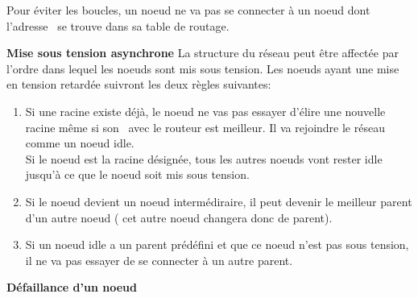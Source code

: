         Pour éviter les boucles, un noeud ne va pas se connecter à un noeud dont l'adresse \mac\ se trouve dans sa table de routage.
        \vspace{0.5cm}

        \textbf{Mise sous tension asynchrone}\newline
            La structure du réseau peut être affectée par l'ordre dans lequel les noeuds sont mis sous tension.
            Les noeuds ayant une mise en tension retardée suivront les deux règles suivantes:
            \begin{enumerate}
                \item Si une racine existe déjà, le noeud ne vas pas essayer d'élire une nouvelle racine
                    même si son \rssi\ avec le routeur est meilleur. Il va rejoindre le réseau comme un noeud idle. \\
                    Si le noeud est la racine désignée, tous les autres noeuds vont rester idle
                    jusqu'à ce que le noeud soit mis sous tension.
                \item Si le noeud devient un noeud intermédiraire, il peut devenir le meilleur parent d'un autre noeud ( cet autre noeud changera donc de parent).
                \item Si un noeud idle a un parent prédéfini et que ce noeud n'est pas sous tension, il ne va pas essayer de se connecter à un autre parent.
            \end{enumerate}
        \vspace{0.5cm}
        \textbf{Défaillance d'un noeud}\newline
